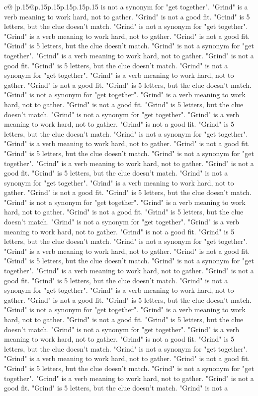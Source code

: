 \documentclass{article}
\begin{document}
{\begin{supertabular}{c@{$\;$}|p{.15\linewidth}@{}p{.15\linewidth}p{.15\linewidth}p{.15\linewidth}p{.15\linewidth}p{.15\linewidth}}
{{{is not a synonym for "get together". "Grind" is a verb meaning to work hard, not to gather. "Grind" is not a good fit. "Grind" is 5 letters, but the clue doesn't match. "Grind" is not a synonym for "get together". "Grind" is a verb meaning to work hard, not to gather. "Grind" is not a good fit. "Grind" is 5 letters, but the clue doesn't match. "Grind" is not a synonym for "get together". "Grind" is a verb meaning to work hard, not to gather. "Grind" is not a good fit. "Grind" is 5 letters, but the clue doesn't match. "Grind" is not a synonym for "get together". "Grind" is a verb meaning to work hard, not to gather. "Grind" is not a good fit. "Grind" is 5 letters, but the clue doesn't match. "Grind" is not a synonym for "get together". "Grind" is a verb meaning to work hard, not to gather. "Grind" is not a good fit. "Grind" is 5 letters, but the clue doesn't match. "Grind" is not a synonym for "get together". "Grind" is a verb meaning to work hard, not to gather. "Grind" is not a good fit. "Grind" is 5 letters, but the clue doesn't match. "Grind" is not a synonym for "get together". "Grind" is a verb meaning to work hard, not to gather. "Grind" is not a good fit. "Grind" is 5 letters, but the clue doesn't match. "Grind" is not a synonym for "get together". "Grind" is a verb meaning to work hard, not to gather. "Grind" is not a good fit. "Grind" is 5 letters, but the clue doesn't match. "Grind" is not a synonym for "get together". "Grind" is a verb meaning to work hard, not to gather. "Grind" is not a good fit. "Grind" is 5 letters, but the clue doesn't match. "Grind" is not a synonym for "get together". "Grind" is a verb meaning to work hard, not to gather. "Grind" is not a good fit. "Grind" is 5 letters, but the clue doesn't match. "Grind" is not a synonym for "get together". "Grind" is a verb meaning to work hard, not to gather. "Grind" is not a good fit. "Grind" is 5 letters, but the clue doesn't match. "Grind" is not a synonym for "get together". "Grind" is a verb meaning to work hard, not to gather. "Grind" is not a good fit. "Grind" is 5 letters, but the clue doesn't match. "Grind" is not a synonym for "get together". "Grind" is a verb meaning to work hard, not to gather. "Grind" is not a good fit. "Grind" is 5 letters, but the clue doesn't match. "Grind" is not a synonym for "get together". "Grind" is a verb meaning to work hard, not to gather. "Grind" is not a good fit. "Grind" is 5 letters, but the clue doesn't match. "Grind" is not a synonym for "get together". "Grind" is a verb meaning to work hard, not to gather. "Grind" is not a good fit. "Grind" is 5 letters, but the clue doesn't match. "Grind" is not a synonym for "get together". "Grind" is a verb meaning to work hard, not to gather. "Grind" is not a good fit. "Grind" is 5 letters, but the clue doesn't match. "Grind" is not a synonym for "get together". "Grind" is a verb meaning to work hard, not to gather. "Grind" is not a good fit. "Grind" is 5 letters, but the clue doesn't match. "Grind" is not a synonym for "get together". "Grind" is a verb meaning to work hard, not to gather. "Grind" is not a good fit. "Grind" is 5 letters, but the clue doesn't match. "Grind" is not a }}}
\end{supertabular}}
\end{document}
